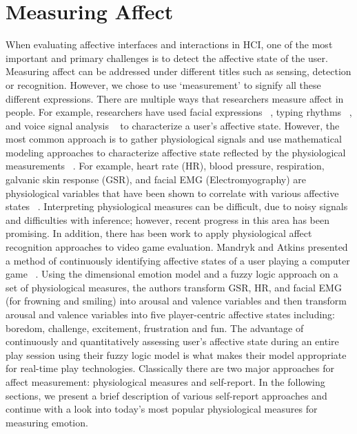\section{Measuring Affect}
When evaluating affective interfaces and interactions in HCI, one of the most important and primary challenges is to detect the affective state of the user. Measuring affect can be addressed under different titles such as sensing, detection or recognition. However, we chose to use `measurement' to signify all these different expressions. There are multiple ways that researchers measure affect in people. For example, researchers have used facial expressions ~\cite{partala2006real}, typing rhythms ~\cite{epp2011identifying}, and voice signal analysis ~\cite{picard2003affective} to characterize a user's affective state. However, the most common approach is to gather physiological signals and use mathematical modeling approaches to characterize affective state reflected by the physiological measurements ~\cite{mandryk2007fuzzy}. For example, heart rate (HR), blood pressure, respiration, galvanic skin response (GSR), and facial EMG (Electromyography) are physiological variables that have been shown to correlate with various affective states ~\cite{mandryk2008physiological}. Interpreting physiological measures can be difficult, due to noisy signals and difficulties with inference; however, recent progress in this area has been promising. In addition, there has been work to apply physiological affect recognition approaches to video game evaluation. Mandryk and Atkins presented a method of continuously identifying affective states of a user playing a computer game ~\cite{mandryk2007fuzzy}. Using the dimensional emotion model and a fuzzy logic approach on a set of physiological measures, the authors transform GSR, HR, and facial EMG (for frowning and smiling) into arousal and valence variables and then transform arousal and valence variables into five player-centric affective states including: boredom, challenge, excitement, frustration and fun. The advantage of continuously and quantitatively assessing user's affective state during an entire play session using their fuzzy logic model is what makes their model appropriate for real-time play technologies. Classically there are two major approaches for affect measurement: physiological measures and self-report. In the following sections, we present a brief description of various self-report approaches and continue with a look into today's most popular physiological measures for measuring emotion.

